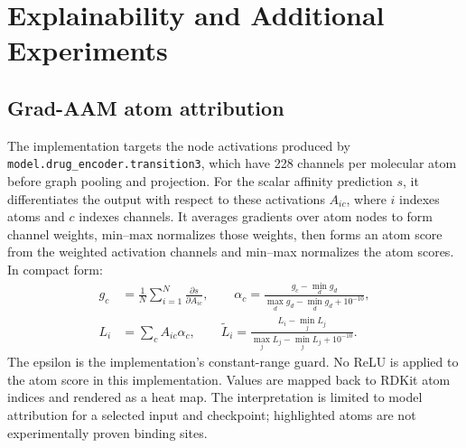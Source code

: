 ﻿\chapter{Explainability and Additional Experiments}
\section{Grad-AAM atom attribution}
The implementation targets the node activations produced by \texttt{model.drug\_encoder.transition3}, which have 228 channels per molecular atom before graph pooling and projection. For the scalar affinity prediction $s$, it differentiates the output with respect to these activations $A_{ic}$, where $i$ indexes atoms and $c$ indexes channels. It averages gradients over atom nodes to form channel weights, min--max normalizes those weights, then forms an atom score from the weighted activation channels and min--max normalizes the atom scores. In compact form:
\begin{align} g_c &= \frac{1}{N}\sum_{i=1}^{N}\frac{\partial s}{\partial A_{ic}},\qquad \alpha_c=\frac{g_c-\min_d g_d}{\max_d g_d-\min_d g_d+10^{-10}},\\ L_i &= \sum_c A_{ic}\alpha_c,\qquad \widetilde L_i=\frac{L_i-\min_j L_j}{\max_j L_j-\min_j L_j+10^{-10}}. \end{align}
The epsilon is the implementation's constant-range guard. No ReLU is applied to the atom score in this implementation. Values are mapped back to RDKit atom indices and rendered as a heat map. The interpretation is limited to model attribution for a selected input and checkpoint; highlighted atoms are not experimentally proven binding sites.

